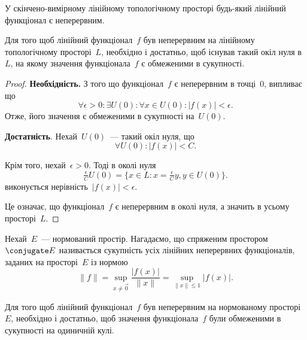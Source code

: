 \begin{remark}
    У скінчено-вимірному лінійному топологічному просторі будь-який лінійний функціонал є неперервним.
\end{remark}

\begin{theorem}
    Для того щоб лінійний функціонал~$f$ був неперервним на лінійному топологічному просторі~$L$, необхідно і достатньо, щоб існував такий окіл нуля в~$L$, на якому значення функціонала~$f$ є обмеженими в сукупності.
\end{theorem}

\begin{proof}
    \textbf{Необхідність.} З того що функціонал~$f$ є неперервним в точці~$0$, випливає що
    \begin{equation*}
        \forall \epsilon > 0: \exists U(0): \forall x \in U(0): |f(x)| < \epsilon.
    \end{equation*}
    Отже, його значення є обмеженими в сукупності на~$U(0)$.
    
    \textbf{Достатність}. Нехай~$U(0)$~--- такий окіл нуля, що
    \begin{equation*}
        \forall U(0): |f(x)| < C.
    \end{equation*}
    
    Крім того, нехай~$\epsilon > 0$. Тоді в околі нуля
    \begin{equation*}
        \tfrac{\epsilon}{C} U(0) = \{ x \in L: x = \tfrac{\epsilon}{C} y, y \in U(0) \}.
    \end{equation*}
    виконується нерівність~$|f(x)| < \epsilon$.
    
    Це означає, що функціонал~$f$ є неперервним в околі нуля, а значить в усьому просторі~$L$.
\end{proof}

Нехай~$E$~--- нормований простір. Нагадаємо, що спряженим простором~$\conjugate E$ називається сукупність усіх лінійних неперервних функціоналів, заданих на просторі~$E$ із нормою
\begin{equation*}
    \|f\| = \sup_{x \ne \vec 0} \frac{|f(x)|}{\|x\|} = \sup_{\|x\| \le 1} |f(x)|.
\end{equation*}

\begin{theorem}
    Для того щоб лінійний функціонал~$f$ був неперервним на нормованому просторі~$E$, необхідно і достатньо, щоб значення функціонала~$f$ були обмеженими в сукупності на одиничній кулі.
\end{theorem}

